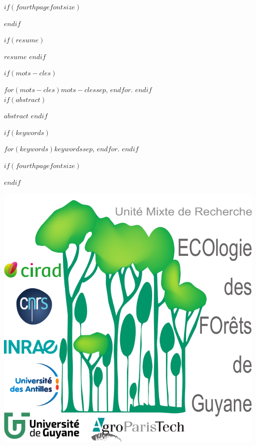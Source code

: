 \documentclass[
  $if(fontsize)$$fontsize$,$endif$
  $if(lang)$$babel-lang$,$endif$
  $if(papersize)$$papersize$paper,$endif$
  $for(classoption)$$classoption$$sep$,$endfor$
  ]{$documentclass$}
\begin{document}
$if(fourthpagefontsize)$
\begin{$fourthpagefontsize$}
$endif$

\begin{description}

$if(resume)$
\item[Résumé:]
$resume$
$endif$

$if(mots-cles)$
\item[Mots clés :]
$for(mots-cles)$$mots-cles$$sep$, $endfor$.
$endif$
~\\

$if(abstract)$
\item[Abstract:]
$abstract$
$endif$

$if(keywords)$
\item[Keywords:]
$for(keywords)$$keywords$$sep$, $endfor$.
$endif$

\end{description}

$if(fourthpagefontsize)$
\end{$fourthpagefontsize$}
$endif$

\vspace*{\fill}
\centering\includegraphics[width=.3\textwidth]{images/Logo-Lab}
\end{document}
